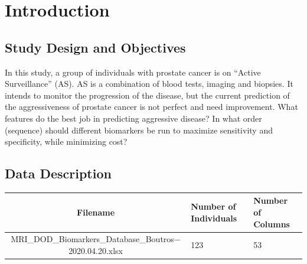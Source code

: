 \documentclass[]{article}
\begin{document}
% 
% 
% 
% 
% 

\section{Introduction}

\subsection{Study Design and Objectives}
\noindent In this study, a group of individuals with prostate cancer is on 
“Active Surveillance” (AS). AS is a combination of blood tests, imaging and biopsies. 
It intends to monitor the progression of the disease, but the current prediction of 
the aggressiveness of prostate cancer is not perfect and need improvement. What features 
do the best job in predicting aggressive disease? In what order (sequence) should 
different biomarkers be run to maximize sensitivity and specificity, while minimizing cost?  

\subsection{Data Description}

\begin{center}
\begin{tabular}{ |c|p{2cm}|p{2cm}|}
\hline
  {\bf Filename} &  {\bf Number of Individuals} & {\bf Number of Columns}  \\
\hline
    MRI\_DOD\_Biomarkers\_Database\_Boutros$-$2020.04.20.xlsx &  123  & 53  \\
\hline
\end{tabular}
\end{center}
\end{document}
